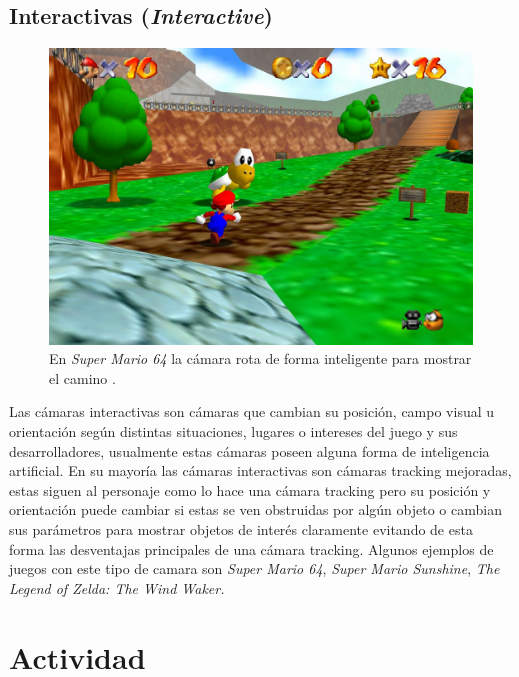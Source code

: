 \subsection{Interactivas (\emph{Interactive})}
\begin{figure}
\includegraphics[width=\linewidth]{semana2/supermario64.jpg} 
\caption{En \emph{Super Mario 64} la cámara rota de forma inteligente para mostrar el camino \cite{supermario64}.}
\end{figure}
Las cámaras interactivas son cámaras que cambian su posición, campo visual u orientación según distintas situaciones, lugares o intereses del juego y sus desarrolladores, usualmente estas cámaras poseen alguna forma de inteligencia artificial. En su mayoría las cámaras interactivas son cámaras tracking mejoradas, estas siguen al personaje como lo hace una cámara tracking pero su posición y orientación puede cambiar si estas se ven obstruidas por algún objeto o cambian sus parámetros para mostrar objetos de interés claramente evitando de esta forma las desventajas principales de una cámara tracking. Algunos ejemplos de juegos con este tipo de camara son \emph{Super Mario 64}, \emph{Super Mario Sunshine}, \emph{The Legend of Zelda: The Wind Waker.}
\section{Actividad}
